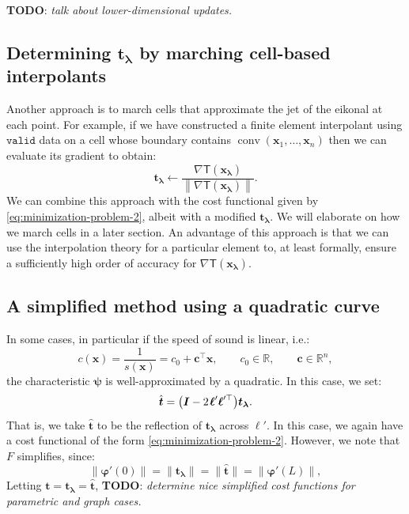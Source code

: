 \documentclass{siamart190516}
\renewcommand{\phi}{\varphi}
\newcommand{\m}[1]{\boldsymbol{#1}}
\newcommand{\valid}{\texttt{valid}}
\newcommand{\xlam}{\m{x}_{\m{\lambda}}}
\newcommand{\that}{\hat{\m{t}}}
\newcommand{\tlam}{\m{t}_{\m{\lambda}}}
\newcommand{\mphi}{\m{\phi}}
\newcommand{\mpsi}{\m{\psi}}
\newcommand{\mell}{\m{\ell}}
\DeclareMathOperator{\conv}{conv}
\begin{document}
\textbf{TODO}: \emph{talk about lower-dimensional updates.}

\subsection{Determining $\tlam$ by marching cell-based
  interpolants}\label{ssec:cell-based}

Another approach is to march cells that approximate the jet of the
eikonal at each point. For example, if we have constructed a finite
element interpolant using $\valid$ data on a cell whose boundary
contains $\conv(\m{x}_1, \hdots, \m{x}_n)$ then we can evaluate its
gradient to obtain:
\begin{equation}
  \tlam \gets \frac{\nabla \mathsf{T}(\xlam)}{\left\|\nabla\mathsf{T}(\xlam)\right\|}.
\end{equation}
We can combine this approach with the cost functional given by
\eqref{eq:minimization-problem-2}, albeit with a modified $\tlam$. We
will elaborate on how we march cells in a later section. An advantage
of this approach is that we can use the interpolation theory for a
particular element to, at least formally, ensure a sufficiently high
order of accuracy for $\nabla \mathsf{T}(\xlam)$.

\subsection{A simplified method using a quadratic curve}\label{ssec:quadratic}

In some cases, in particular if the speed of sound is linear, i.e.:
\begin{equation}
  c(\m{x}) = \frac{1}{s(\m{x})} = c_0 + \m{c}^\top \m{x}, \qquad c_0 \in \mathbb{R}, \qquad \m{c} \in \mathbb{R}^n,
\end{equation}
the characteristic $\mpsi$ is well-approximated by a
quadratic. In this case, we set:
\begin{equation}
  \that = \big(\m{I} - 2 \hspace{0.1em} \mell' \mell'^\top\big) \tlam.
\end{equation}
That is, we take $\that$ to be the reflection of $\tlam$ across
$\mell'$. In this case, we again have a cost functional of the form
\eqref{eq:minimization-problem-2}. However, we note that $F$
simplifies, since:
\begin{equation}
  \|\mphi'(0)\| = \|\tlam\| = \|\that\| = \|\mphi'(L)\|,
\end{equation}
Letting $\m{t} = \tlam = \that$, \textbf{TODO}: \emph{determine nice
  simplified cost functions for parametric and graph cases.}
\end{document}
